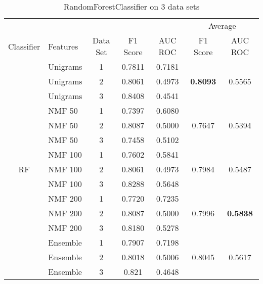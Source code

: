 \documentclass[12pt, twoside]{article}
\begin{document}
\begin{table}[!htbp]
  \centering
  \begin{tabular}{clccccc}
  \toprule
  {} & {} &	{}	& {}	&	{} & \multicolumn{2}{c}{Average} \\
  \cmidrule(r){6-7}
  Classifier	&	Features	&	Data Set	&	F1 Score	&	AUC ROC	&	F1 Score	&	AUC ROC \\
  \midrule
  	&	Unigrams	&	1	&	0.7811	&	0.7181	&		&	 \\
  	&	Unigrams	&	2	&	0.8061	&	0.4973	&	\textbf{0.8093}	&	0.5565 \\
  	&	Unigrams	&	3	&	0.8408	&	0.4541	&		&	 \\
  	\cmidrule(r){2-7}
  	&	NMF 50	&	1	&	0.7397	&	0.6080	&		&	 \\
  	&	NMF 50	&	2	&	0.8087	&	0.5000	&	0.7647	&	0.5394 \\
  	&	NMF 50	&	3	&	0.7458	&	0.5102	&		&	 \\
  	\cmidrule(r){2-7}
  	&	NMF 100	&	1	&	0.7602	&	0.5841	&		&	 \\
  RF	&	NMF 100	&	2	&	0.8061	&	0.4973	&	0.7984	&	0.5487 \\
  	&	NMF 100	&	3	&	0.8288	&	0.5648	&		&	 \\
  	\cmidrule(r){2-7}
  	&	NMF 200	&	1	&	0.7720	&	0.7235	&		&	 \\
  	&	NMF 200	&	2	&	0.8087	&	0.5000	&	0.7996	&	\textbf{0.5838} \\
  	&	NMF 200	&	3	&	0.8180	&	0.5278	&		&	 \\
  	\cmidrule(r){2-7}
  	&	Ensemble	&	1	&	0.7907	&	0.7198	&		&	 \\
  	&	Ensemble	&	2	&	0.8018	&	0.5006	&	0.8045	&	0.5617 \\
  	&	Ensemble	&	3	&	0.821	&	0.4648	&		&	 \\
  \bottomrule
  \end{tabular}
  \caption{RandomForestClassifier on 3 data sets}
\end{table}

\newpage
\end{document}
